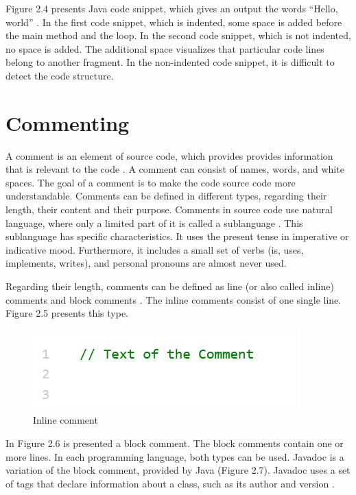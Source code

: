 Figure 2.4 presents Java code snippet, which gives an output the words “Hello, world”  \cite{hanenberg2024indentation}.
In the first code snippet, which is indented, some space is added before the main method and the loop.  In the second code snippet, which is not indented, no space is added. The additional space visualizes that particular code lines belong to another fragment. In the non-indented code snippet, it is difficult to detect the code structure. 
 





\section{Commenting}
A comment is an element of source code, which provides provides information that is relevant to the code \cite{de2011comment}. A comment can consist of names, words, and white spaces.  The goal of a comment is to make the code source code more understandable.  Comments can be defined in different types, regarding their length, their content and their purpose. Comments in source code use natural language, where only a limited part of it is called a sublanguage \cite{de2017investigating}. This sublanguage has specific characteristics. It uses the present tense in imperative or indicative mood. Furthermore, it includes a small set of verbs (is, uses, implements, writes), and personal pronouns are almost never used.

Regarding their length, comments can be defined as line (or also called inline) comments and block comments \cite{de2017investigating}. The inline comments consist of one single line. Figure 2.5 presents this type. 

\begin{figure} [H]
  \centering
  \includegraphics [scale=1]
  {figures/inline.png}
  \caption{Inline comment 
  \cite{de2011comment}}
  \label{fig:AnhangsChor}
\end{figure}

In Figure 2.6 is presented a block comment. The block comments contain one or more lines. In each programming language, both types can be used. Javadoc is a variation of the block comment, provided by Java (Figure 2.7).  Javadoc uses a set of tags that declare information about a class, such as its author and version \cite{de2011comment}.

